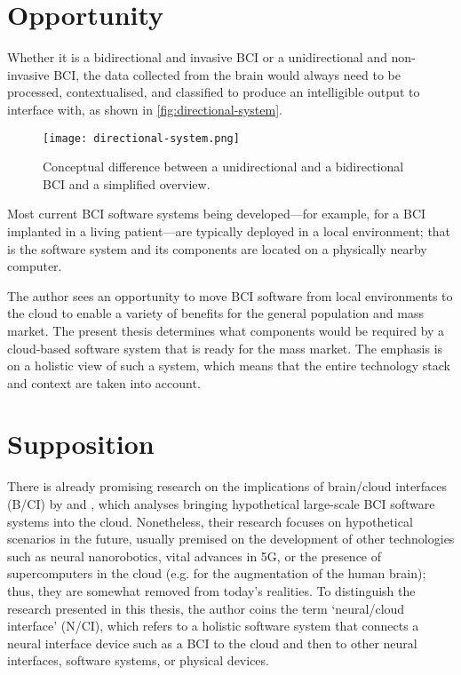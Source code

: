\section{Opportunity}
\label{chapter1-opportunity}

Whether it is a bidirectional and invasive BCI or a unidirectional and non-invasive BCI, the data collected from the brain would always need to be processed, contextualised, and classified to produce an intelligible output to interface with, as shown in \autoref{fig:directional-system}.

\begin{figure}[ht]
  \centering
  \texttt{[image: directional-system.png]}
  \caption{Conceptual difference between a unidirectional and a bidirectional BCI and a simplified overview.}
  \label{fig:directional-system}
\end{figure}

Most current BCI software systems being developed—for example, for a BCI implanted in a living patient—are typically deployed in a local environment; that is the software system and its components are located on a physically nearby computer.

The author sees an opportunity to move BCI software from local environments to the cloud to enable a variety of benefits for the general population and mass market. The present thesis determines what components would be required by a cloud-based software system that is ready for the mass market. The emphasis is on a holistic view of such a system, which means that the entire technology stack and context are taken into account.

\section{Supposition}
\label{chapter1-supposition}

There is already promising research on the implications of brain/cloud interfaces (B/CI) by \citeauthor{martins_human_2019} \parencite*{martins_human_2019} and \citeauthor{angelica_cognitive_2021} \parencite*{angelica_cognitive_2021}, which analyses bringing hypothetical large-scale BCI software systems into the cloud. Nonetheless, their research focuses on hypothetical scenarios in the future, usually premised on the development of other technologies such as neural nanorobotics, vital advances in 5G, or the presence of supercomputers in the cloud (e.g. for the augmentation of the human brain); thus, they are somewhat removed from today’s realities. To distinguish the research presented in this thesis, the author coins the term ‘neural/cloud interface’ (N/CI), which refers to a holistic software system that connects a neural interface device such as a BCI to the cloud and then to other neural interfaces, software systems, or physical devices.

